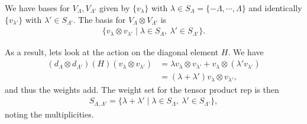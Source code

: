 We have bases for $V_{\Lambda}, V_{\Lambda'}$ given by $\{v_{\lambda}\} $ with $\lambda \in S_{\Lambda} = \{-\Lambda, \cdots, \Lambda \}$ and identically $\{v_{\lambda'}\} $ with $\lambda' \in S_{\Lambda'}$. The basis for $V_{\Lambda} \otimes V_{\Lambda'}$ is
\begin{align}
    \{v_{\lambda} \otimes v_{\lambda'}  \mid  \lambda \in S_{\Lambda},~ \lambda' \in S_{\Lambda'}\} 
.\end{align}

As a result, lets look at the action on the diagonal element $H$. We have
\begin{align}
    \left( d_{\Lambda} \otimes d_{\Lambda'} \right) \left( H \right) \left( v_{\lambda} \otimes v_{\lambda'} \right) &= \lambda v_{\lambda} \otimes v_{\lambda'} + v_{\lambda} \otimes \left( \lambda' v_{\lambda'} \right)   \\
    &= \left( \lambda + \lambda' \right) v_{\lambda} \otimes v_{\lambda'}
,\end{align}
and thus the weights add. The weight set for the tensor product rep is then
\begin{align}
    S_{\Lambda, \Lambda'} = \{\lambda + \lambda'  \mid \lambda \in S_{\Lambda},~ \lambda' \in S_{\Lambda'}\} 
,\end{align}
noting the multiplicities.



